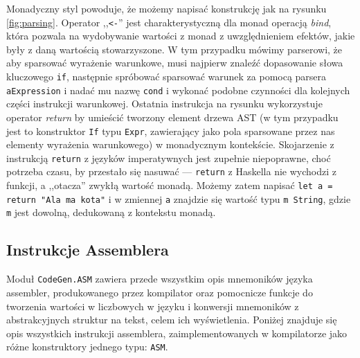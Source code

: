 Monadyczny styl powoduje, że możemy napisać konstrukcję jak na rysunku \ref{fig:parsing}. Operator ,,\texttt{<-}'' jest charakterystyczną dla monad operacją \textit{bind}, która pozwala na wydobywanie wartości z monad z uwzględnieniem efektów, jakie były z daną wartością stowarzyszone. W tym przypadku mówimy parserowi, że aby sparsować wyrażenie warunkowe, musi najpierw znaleźć dopasowanie słowa kluczowego \texttt{if}, następnie spróbować sparsować warunek za pomocą parsera \texttt{aExpression} i nadać mu nazwę \texttt{cond} i wykonać podobne czynności dla kolejnych części instrukcji warunkowej. Ostatnia instrukcja na rysunku wykorzystuje operator \textit{return} by umieścić tworzony element drzewa AST (w tym przypadku jest to konstruktor \texttt{If} typu \texttt{Expr}, zawierający jako pola sparsowane przez nas elementy wyrażenia warunkowego) w monadycznym kontekście. Skojarzenie z instrukcją \texttt{return} z języków imperatywnych jest zupełnie niepoprawne, choć potrzeba czasu, by przestało się nasuwać --- \texttt{return} z Haskella nie wychodzi z funkcji, a ,,otacza'' zwykłą wartość monadą. Możemy zatem napisać \texttt{let a = return "Ala ma kota"} i w zmiennej \texttt{a} znajdzie się wartość typu \texttt{m String}, gdzie \texttt{m} jest dowolną, dedukowaną z kontekstu monadą.


\subsection{Instrukcje Assemblera}

Moduł \texttt{CodeGen.ASM} zawiera przede wszystkim opis mnemoników języka assembler, produkowanego przez kompilator oraz pomocnicze funkcje do tworzenia wartości w liczbowych w języku i konwersji mnemoników z abstrakcyjnych struktur na tekst, celem ich wyświetlenia. Poniżej znajduje się opis wszystkich instrukcji assemblera, zaimplementowanych w kompilatorze jako różne konstruktory jednego typu: \texttt{ASM}.


